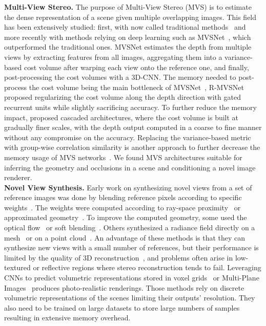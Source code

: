 \noindent\textbf{Multi-View Stereo.} The purpose of Multi-View Stereo (MVS) is to estimate the dense representation of a scene given multiple overlapping images. This field has been extensively studied: first, with now called traditional methods~\citep{kolmogorov2002multi, de1999poxels, furukawa2009accurate, schonberger2016pixelwise} and more recently with methods relying on deep learning such as MVSNet~\citep{yao2018mvsnet}, which outperformed the traditional ones. MVSNet estimates the depth from multiple views by extracting features from all images, aggregating them into a variance-based cost volume after warping each view onto the reference one, and finally, post-processing the cost volumes with a 3D-CNN. The memory needed to post-process the cost volume being the main bottleneck of MVSNet~\citep{yao2018mvsnet}, R-MVSNet~\citep{yao2019recurrent} proposed regularizing the cost volume along the depth direction with gated recurrent units while slightly sacrificing accuracy. To further reduce the memory impact, \cite{gu2020cascade,cheng2020deep,yang2020cost} proposed cascaded architectures, where the cost volume is built at gradually finer scales, with the depth output computed in a coarse to fine manner without any compromise on the accuracy. Replacing the variance-based metric with group-wise correlation similarity is another approach to further decrease the memory usage of MVS networks~\citep{xu2020learning}. We found MVS architectures suitable for inferring the geometry and occlusions in a scene and conditioning a novel image renderer. \\

\noindent\textbf{Novel View Synthesis.} Early work on synthesizing novel views from a set of reference images was done by blending reference pixels according to specific weights~\citep{debevec1996modeling, levoy1996light}. The weights were computed according to ray-space proximity~\citep{levoy1996light} or approximated geometry~\citep{buehler2001unstructured, debevec1996modeling}. To improve the computed geometry, some used the optical flow~\citep{casas20154d, du2018montage4d} or soft blending~\citep{penner2017soft}. Others synthesized a radiance field directly on a mesh~\citep{debevec1998efficient, huang2020adversarial} or on a point cloud~\citep{aliev2020neural, meshry2019neural}. An advantage of these methods is that they can synthesize new views with a small number of references, but their performance is limited by the quality of 3D reconstruction~\citep{jancosek2011multi, schonberger2016structure}, and problems often arise in low-textured or reflective regions where stereo reconstruction tends to fail. Leveraging CNNs to predict volumetric representations stored in voxel grids~\citep{kalantari2016learning, penner2017soft, henzler2020learning} or Multi-Plane Images~\citep{flynn2016deepstereo, zhou2018stereo, srinivasan2019pushing,flynn2019deepview} produces photo-realistic renderings. Those methods rely on discrete volumetric representations of the scenes limiting their outputs' resolution. They also need to be trained on large datasets to store large numbers of samples resulting in extensive memory overhead. \\

